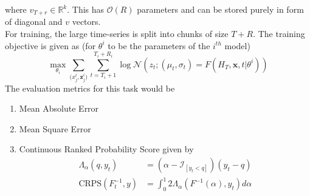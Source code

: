 where $v_{T+r} \in \mathbb{R}^k$. This has $\mathcal{O}(R)$ parameters and can be stored purely in form of diagonal and $v$ vectors. \\
For training, the large time-series is split into chunks of size $T+R$. The training objective is given as (for $\theta^i$ to be the parameters of the $i^{th}$ model)
\begin{equation}
	\max_{\theta_i} \sum_{\mathbf (x_j^i, \mathbf z_j^i)} \sum_{t=T_i+1}^{T_i + R_i} \log \mathcal{N}(z_t;(\mu_t, \sigma_t) = F(H_T, \mathbf x, t | \theta^i))
\end{equation}
The evaluation metrics for this task would be
\begin{enumerate}
	\item Mean Absolute Error
	\item Mean Square Error
	\item Continuous Ranked Probability Score given by
	\begin{equation}
	\begin{split}
		\Lambda_\alpha(q, y_t) &= (\alpha - \mathcal{I}_{[y_t < q]})(y_t-q) \\
		\text{CRPS}(F_t^{-1}, y) &= \int_0^1 2 \Lambda_\alpha(F^{-1}(\alpha), y_t)d\alpha
	\end{split}
	\end{equation}
\end{enumerate}